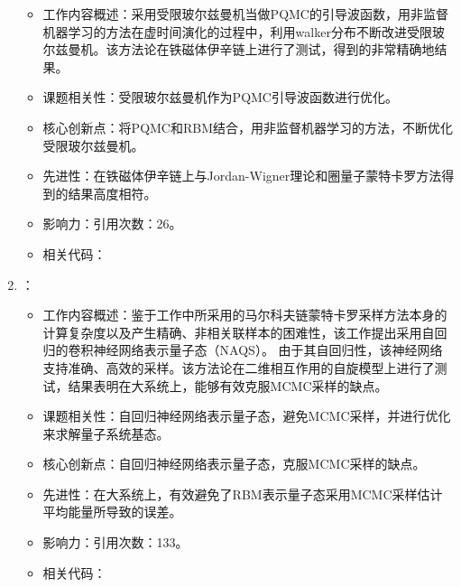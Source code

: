 \begin{enumerate}
            \begin{itemize}
                \item 工作内容概述：采用受限玻尔兹曼机当做PQMC的引导波函数，用非监督机器学习的方法在虚时间演化的过程中，利用walker分布不断改进受限玻尔兹曼机。该方法论在铁磁体伊辛链上进行了测试，得到的非常精确地结果。
                \item 课题相关性：受限玻尔兹曼机作为PQMC引导波函数进行优化。
                \item 核心创新点：将PQMC和RBM结合，用非监督机器学习的方法，不断优化受限玻尔兹曼机。
                \item 先进性：在铁磁体伊辛链上与Jordan-Wigner理论和圈量子蒙特卡罗方法得到的结果高度相符。
                \item 影响力：引用次数：26。
                \item 相关代码：
            \end{itemize}
            \item \citet{sharir2020deep}：
            \begin{itemize}
                \item 工作内容概述：鉴于\citet{carleo2017solving}工作中所采用的马尔科夫链蒙特卡罗采样方法本身的计算复杂度以及产生精确、非相关联样本的困难性，该工作提出采用自回归的卷积神经网络表示量子态（NAQS）。
                由于其自回归性，该神经网络支持准确、高效的采样。该方法论在二维相互作用的自旋模型上进行了测试，结果表明在大系统上，能够有效克服MCMC采样的缺点。
                \item 课题相关性：自回归神经网络表示量子态，避免MCMC采样，并进行优化来求解量子系统基态。
                \item 核心创新点：自回归神经网络表示量子态，克服MCMC采样的缺点。
                \item 先进性：在大系统上，有效避免了RBM表示量子态采用MCMC采样估计平均能量所导致的误差。
                \item 影响力：引用次数：133。
                \item 相关代码：
            \end{itemize}
        \end{enumerate}

